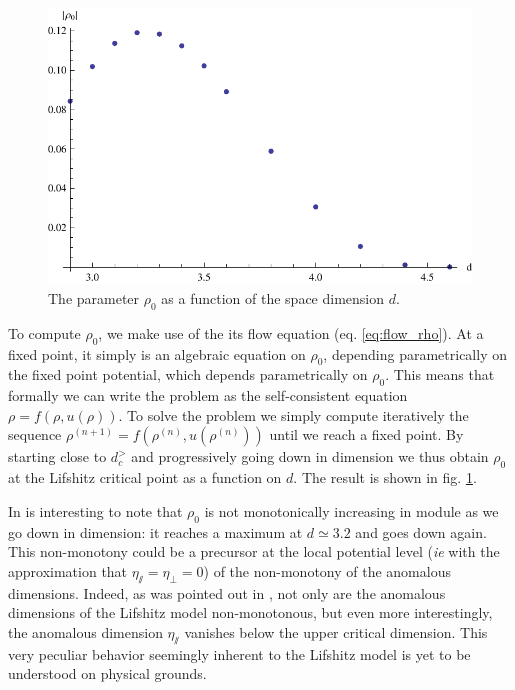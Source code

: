 \begin{figure}[htp]
\begin{center}
\includegraphics[scale=1]{img/chap4/rhod.pdf}
\caption{The parameter $\rho_0$ as a function of the space dimension $d$.}
\label{fig:rhod}
\end{center}
\end{figure}

To compute $\rho_0$, we make use of the its flow equation (eq. \ref{eq:flow_rho}). At a fixed point, it simply is an algebraic equation on $\rho_0$, depending parametrically on the fixed point potential, which depends parametrically on $\rho_0$.  This means that formally we can write the problem as the self-consistent equation $\rho = f(\rho, u(\rho))$. To solve the problem we simply compute iteratively the sequence $\rho^{(n+1)} = f(\rho^{(n)}, u(\rho^{(n)}))$ until we reach a fixed point. By starting close to $d_c^>$ and progressively going down in dimension we thus obtain $\rho_0$ at the Lifshitz critical point as a function on $d$. The result is shown in fig. \ref{fig:rhod}. 

In is interesting to note that $\rho_0$ is not monotonically increasing in module as we go down in dimension: it reaches a maximum at $d \simeq 3.2$ and goes down again. This non-monotony could be a precursor at the local potential level (\textit{ie} with the approximation that $\eta_\sslash = \eta_\perp  = 0$) of the non-monotony of the anomalous dimensions. Indeed, as was pointed out in \cite{MouhannaLif}, not only are the anomalous dimensions of the Lifshitz model non-monotonous, but even more interestingly, the anomalous dimension $\eta_\sslash$ vanishes below the upper critical dimension. This very peculiar behavior seemingly inherent to the Lifshitz model  is yet to be understood on physical grounds.

